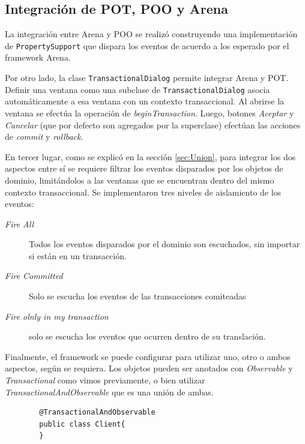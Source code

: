 \subsection{Integración de POT, POO y Arena}
La integración entre Arena y POO se realizó construyendo una implementación de
\lstinline|PropertySupport| que dispara los eventos de acuerdo a los esperado
por el framework Arena.

\medskip
Por otro lado, la clase \lstinline|TransactionalDialog| permite integrar Arena y
POT.
Definir una ventana como una subclase de
\lstinline|TransactionalDialog| asocia automáticamente a esa ventana con un
contexto transaccional.
Al abrirse la ventana se efectúa la operación de \emph{beginTransaction}.
Luego, botones \emph{Aceptar} y \emph{Cancelar} (que por defecto son agregados
por la superclase) efectúan las acciones de \emph{commit} y
\emph{rollback}.

\medskip
En tercer lugar, como se explicó en la sección \ref{sec:Union}, para integrar
los dos aspectos entre sí se requiere filtrar los eventos disparados por los objetos de dominio, 
limitándolos a las ventanas que se encuentran dentro del mismo contexto
transaccional. 
Se implementaron tres niveles de aislamiento de los eventos:
\begin{description}
	\item[\emph{Fire All}] Todos los eventos disparados por el dominio son
	escuchados, sin importar si están en un transacción.

	\item[\emph{Fire Committed}] Solo se escucha los eventos de las transacciones
		comiteadas
	
	\item[\emph{Fire olnly in my transaction}] solo se escucha los eventos que
		ocurren dentro de su translación.
 \end{description}
 
\medskip
Finalmente, el framework se puede configurar para utilizar uno, otro o ambos
aspectos, según se requiera.
Los objetos pueden ser anotados con \emph{Observable} y
\emph{Transactional} como vimos previamente, 
o bien utilizar \emph{TransactionalAndObservable} que es una unión de ambas.

	\begin{lstlisting} 
		@TransactionalAndObservable
		public class Client{
		}
	\end{lstlisting}

